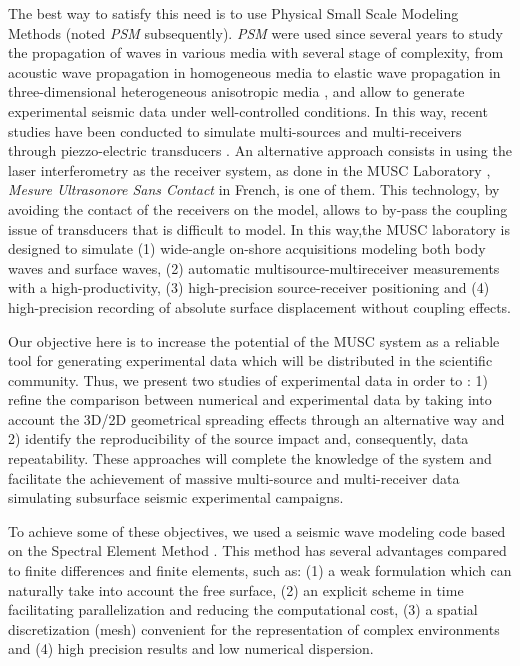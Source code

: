 \documentclass[manuscript,revised]{geophysics}
\newcommand{\psm}{\textit{PSM} }
\newcommand{\thrd}{three-dimensional }
\begin{document}
\noindent The best way to satisfy this need is to use Physical Small Scale Modeling Methods (noted \psm subsequently). \psm were used since several years to study the propagation of waves in various media with several stage of complexity, from acoustic wave propagation in homogeneous media to elastic wave propagation in \thrd heterogeneous anisotropic media \citep{Rieber_EWP_1936,Howes_SMS_1953,Hilterman_TDM_1970,French_MRP_1974,Bishop_LVM_1985,Pratt_FWI_1999,Favretto_NMT_2013,Sarkar_TPM_2003,Isaac_SMS_1999}, and allow to generate experimental seismic data under well-controlled conditions. In this way, recent studies have been conducted to simulate multi-sources and multi-receivers through piezzo-electric transducers \citep{Wong_SPM_2009}. An alternative approach consists in using the laser interferometry as the receiver system, as done in the MUSC Laboratory \citep{Bretaudeau_SSA_2008b,Bretaudeau_SSM_2011,Bretaudeau_FWI_2013}, \textit{Mesure Ultrasonore Sans Contact} in French, is one of them. This technology, by avoiding the contact of the receivers on the model, allows to by-pass the coupling issue of transducers that is difficult to model. In this way,the MUSC laboratory is designed to simulate (1) wide-angle on-shore acquisitions modeling both body waves and surface waves, (2) automatic multisource-multireceiver measurements with a high-productivity, (3) high-precision source-receiver positioning and (4) high-precision recording of absolute surface displacement without coupling effects. 
	
\noindent Our objective here is to increase the potential of the MUSC system as a reliable tool for generating experimental data which will be distributed in the scientific community. 
\noindent Thus, we present two studies of experimental data in order to : 1) refine the comparison between numerical and experimental data by taking into account the 3D/2D geometrical spreading effects through an alternative way and 2) identify the reproducibility of the source impact and, consequently, data repeatability. These approaches will complete the knowledge of the system and facilitate the achievement of massive multi-source and multi-receiver data simulating subsurface seismic experimental campaigns.
	
\noindent To achieve some of these objectives, we used a seismic wave modeling code based on the Spectral Element Method \citep{Komatitsch_SEM_1998,Komatitsch_ISM_1999,Komatitsch_SEM_2005,Festa_PML_2005}. This method has several advantages compared to finite differences and finite elements, such as: (1) a weak formulation which can naturally take into account the free surface, (2) an explicit scheme in time facilitating parallelization and reducing the computational cost, (3) a spatial discretization (mesh) convenient for the representation of complex environments and (4) high precision results and low numerical dispersion.
	
\end{document}
